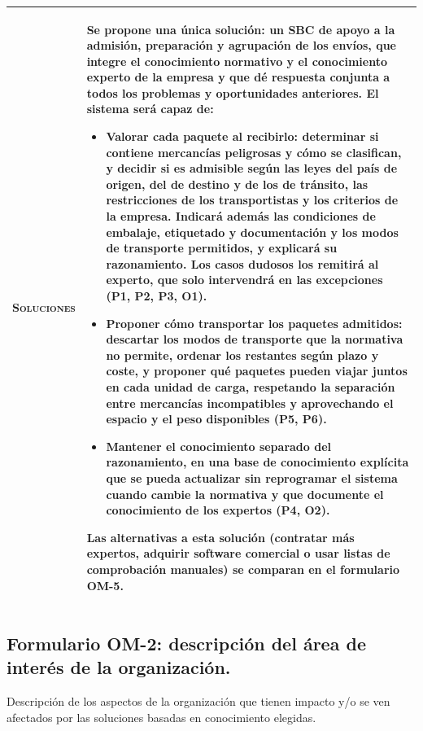 \documentclass[12pt,a4paper,twoside,spanish]{article}      %
\begin{document}
{\begin{longtable}{|p{2.8cm}|p{12.6cm}|}
\textsc{Soluciones} &
Se propone una única solución: \textbf{un SBC de apoyo a la admisión, preparación y agrupación de los envíos}, que integre el conocimiento normativo y el conocimiento experto de la empresa y que dé respuesta conjunta a todos los problemas y oportunidades anteriores. El sistema será capaz de:
\begin{itemize}
    \item \textbf{Valorar cada paquete al recibirlo}: determinar si contiene mercancías peligrosas y cómo se clasifican, y decidir si es admisible según las leyes del país de origen, del de destino y de los de tránsito, las restricciones de los transportistas y los criterios de la empresa. Indicará además las condiciones de embalaje, etiquetado y documentación y los modos de transporte permitidos, y explicará su razonamiento. Los casos dudosos los remitirá al experto, que solo intervendrá en las excepciones (P1, P2, P3, O1).
    \item \textbf{Proponer cómo transportar los paquetes admitidos}: descartar los modos de transporte que la normativa no permite, ordenar los restantes según plazo y coste, y proponer qué paquetes pueden viajar juntos en cada unidad de carga, respetando la separación entre mercancías incompatibles y aprovechando el espacio y el peso disponibles (P5, P6).
    \item \textbf{Mantener el conocimiento separado del razonamiento}, en una base de conocimiento explícita que se pueda actualizar sin reprogramar el sistema cuando cambie la normativa y que documente el conocimiento de los expertos (P4, O2).
\end{itemize}
Las alternativas a esta solución (contratar más expertos, adquirir software comercial o usar listas de comprobación manuales) se comparan en el formulario OM-5. \\ \hline
\end{longtable}
}


\pagebreak
\subsection{Formulario OM-2: descripción del área de interés de la organización.}

Descripción de los aspectos de la organización que tienen impacto y/o se ven afectados por las soluciones basadas en conocimiento elegidas.

\end{document}
